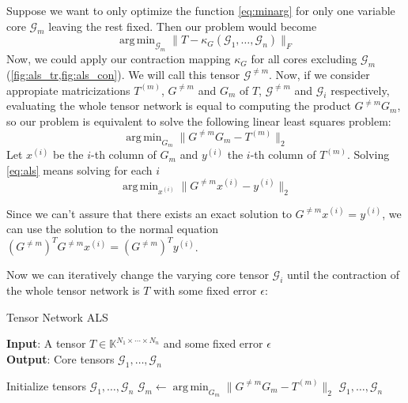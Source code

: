 \documentclass[11pt,a4paper,openright,oneside]{book}
\numberwithin{equation}{section}
\newcommand{\figref}[1]{\cref{#1}}
\newcommand{\refeq}[1]{\cref{#1}}
\DeclareMathOperator*{\argmin}{arg\,min}
\begin{document}
\cite{malikSamplingBasedDecompositionAlgorithms2022a}
Suppose we want to only optimize the function \refeq{eq:minarg} for 
only one variable core $\mathcal{G}_m$ leaving the rest fixed. Then our problem would become
$$\argmin_{\mathcal{G}_m} \|T - \kappa_G(\mathcal{G}_1, \dots, \mathcal{G}_n)\|_F$$
Now, we could apply our contraction mapping $\kappa_G$ for all cores excluding $\mathcal{G}_m$ (\figref{fig:als_tr,fig:als_con}).
We will call this tensor $\mathcal{G}^{\neq m}$. Now, if we consider appropiate matricizations $T^{(m)}$, $G^{\neq m}$ and $G_m$
of $T$, $\mathcal{G}^{\neq m}$ and $\mathcal{G}_i$ respectively, evaluating the whole tensor network
is equal to computing the product $G^{\neq m} G_m$, so our problem is equivalent to solve the 
following linear least squares problem:
\begin{equation}
    \argmin_{G_m} \| G^{\neq m} G_m - T^{(m)}\|_2
\label{eq:als}
\end{equation}
Let $x^{(i)}$ be the $i$-th column of $G_m$ and $y^{(i)}$ the $i$-th
column of $T^{(m)}$. Solving \ref{eq:als} means solving for each $i$ 
\begin{equation}
    \argmin_{x^{(i)}} \| G^{\neq m} x^{(i)} - y^{(i)} \|_2
\end{equation}

Since we can't assure that there exists an exact solution to $G^{\neq m} x^{(i)} = y^{(i)}$,
we can use the solution to the normal equation $(G^{\neq m})^T G^{\neq m} x^{(i)} = (G^{\neq m})^T y^{(i)}$.

Now we can iteratively change the varying core tensor $\mathcal{G}_i$ until the contraction of the whole tensor network
is $T$ with some fixed error $\epsilon$:

\begin{algorithm}
    \caption{Tensor Network ALS}

    \hspace*{\algorithmicindent} \textbf{Input}: A tensor $T \in \mathbb{K}^{N_1 \times \cdots \times N_n}$ and some fixed error $\epsilon$ \\
    \hspace*{\algorithmicindent} \textbf{Output}: Core tensors $\mathcal{G}_1, \dots, \mathcal{G}_n$ 

    \begin{algorithmic}[1]
        \State Initialize tensors $\mathcal{G}_1, \dots, \mathcal{G}_n$
            \State $\mathcal{G}_m \leftarrow \argmin_{G_m} \|G^{\neq m} G_m - T^{(m)}\|_2$
            \EndFor
        \EndWhile
        \State \Return $\mathcal{G}_1, \dots, \mathcal{G}_n$

    \end{algorithmic}

\end{algorithm}
\end{document}
